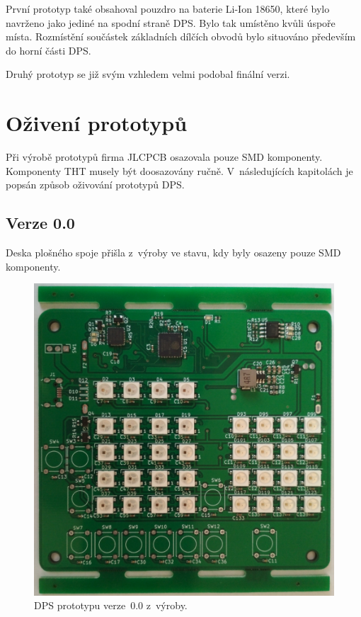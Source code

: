   První prototyp také obsahoval pouzdro na baterie Li-Ion 18650, které bylo navrženo jako jediné na spodní straně DPS. Bylo tak umístěno
  kvůli úspoře místa. Rozmístění součástek základních dílčích obvodů bylo situováno především do horní části DPS. 

  Druhý prototyp se již svým vzhledem velmi podobal finální verzi.
  
  \section{Oživení prototypů}
  Při výrobě prototypů firma JLCPCB osazovala pouze SMD komponenty. Komponenty THT musely být doosazovány ručně. V~následujících kapitolách
  je popsán způsob oživování prototypů DPS.

  \subsection{Verze 0.0}
  Deska plošného spoje přišla z~výroby ve stavu, kdy byly osazeny pouze SMD komponenty.

  \begin{figure}[!h]
    \begin{center}
      \includegraphics[scale=0.1]{obrazky/Verze0_vyroba_kolejnice.jpg}
    \end{center}
    \caption[DPS prototypu verze~0.0 z~výroby]{DPS prototypu verze~0.0 z~výroby.}
  \end{figure}

